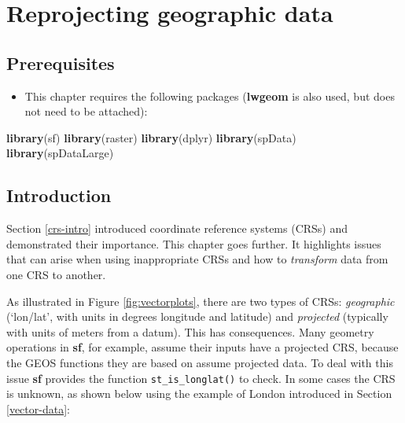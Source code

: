 \documentclass[]{krantz}
\newenvironment{Shaded}{\begin{snugshade}}{\end{snugshade}}
\newcommand{\KeywordTok}[1]{\textcolor[rgb]{0.27,0.27,0.27}{\textbf{#1}}}
\newcommand{\NormalTok}[1]{#1}
\providecommand{\tightlist}{%
  \setlength{\itemsep}{0pt}\setlength{\parskip}{0pt}}
\begin{document}
\hypertarget{reproj-geo-data}{%
\section{Reprojecting geographic data}\label{reproj-geo-data}}

\hypertarget{prerequisites-4}{%
\subsection*{Prerequisites}\label{prerequisites-4}}

\begin{itemize}
\tightlist
\item
  This chapter requires the following packages (\textbf{lwgeom} is also used, but does not need to be attached):
\end{itemize}

\begin{Shaded}
\begin{Highlighting}[]
\KeywordTok{library}\NormalTok{(sf)}
\KeywordTok{library}\NormalTok{(raster)}
\KeywordTok{library}\NormalTok{(dplyr)}
\KeywordTok{library}\NormalTok{(spData)}
\KeywordTok{library}\NormalTok{(spDataLarge)}
\end{Highlighting}
\end{Shaded}

\hypertarget{introduction-3}{%
\subsection{Introduction}\label{introduction-3}}

Section \ref{crs-intro} introduced coordinate reference systems (CRSs) and demonstrated their importance.
This chapter goes further.
It highlights issues that can arise when using inappropriate CRSs and how to \emph{transform} data from one CRS to another.

As illustrated in Figure \ref{fig:vectorplots}, there are two types of CRSs: \emph{geographic} (`lon/lat', with units in degrees longitude and latitude) and \emph{projected} (typically with units of meters from a datum).
This has consequences.
Many geometry operations in \textbf{sf}, for example, assume their inputs have a projected CRS, because the GEOS functions they are based on assume projected data.
To deal with this issue \textbf{sf} provides the function \texttt{st\_is\_longlat()} to check.
In some cases the CRS is unknown, as shown below using the example of London introduced in Section \ref{vector-data}:
\end{document}
